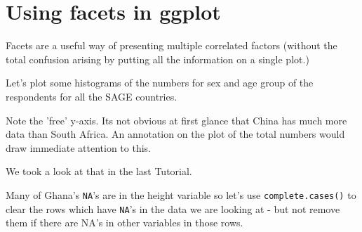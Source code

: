 \documentclass[titlepage]{book}\usepackage{knitr}
\begin{document}
\section{Using facets in ggplot}

Facets are a useful way of presenting multiple correlated factors (without the total confusion arising by putting all the information on a single plot.)

Let's plot some histograms of the numbers for sex and age group of the respondents for all the SAGE countries.

\begin{knitrout}
\color{fgcolor}\begin{kframe}
\begin{alltt}
 \hlkwb{<-}  \hlstd{(}  \hlopt{+}
  \hlstd{(} \hlstd{=} \hlstd{)} \hlopt{+}
   \hlopt{~} \hlstd{=}\hlstd{)}
\end{alltt}
\end{kframe}
\end{knitrout}
Note the 'free' y-axis. Its not obvious at first glance that China has much more data than South Africa.  An annotation on the plot of the total numbers would draw immediate attention to this. 

 We took a look at that in the last Tutorial.

 Many of Ghana's \texttt{NA}'s are in the height variable so let's use \texttt{complete.cases()} to clear the rows which have \texttt{NA}'s in the data we are looking at - but not remove them if there are NA's in other variables in those rows.

\begin{knitrout}
\color{fgcolor}
\end{knitrout}
\end{document}
